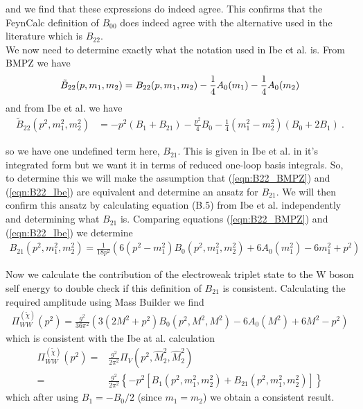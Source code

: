 \documentclass[11pt]{article}
\newcommand{\mb}{\textsf{Mass Builder} }
\newcommand{\feyncalc}{\textsf{FeynCalc} }
\begin{document}
and we find that these expressions do indeed agree.  This confirms that the \feyncalc definition of $B_{00}$ does indeed agree with the alternative used in the literature which is $B_{22}$.\\

We now need to determine exactly what the notation used in Ibe et al. is.  From BMPZ we have
\begin{align}
 \tilde
B_{22}(p,m_1,m_2)= B_{22}(p,m_1,m_2) - {1\over4}A_0(m_1) -
{1\over4}A_0(m_2) \label{eqn:B22_BMPZ}
\end{align}
and from Ibe et al. we have
\begin{align}
{\tilde B}_{22}(p^2, m_1^2, m_2^2) &=
- p^2 (B_1 + B_{21}) - \frac{p^2}{4} B_0 - \frac{1}{4}(m_1^2 - m_2^2) (B_0 + 2B_1)\ . \label{eqn:B22_Ibe}
\end{align}

so we have one undefined term here, $B_{21}$.  This is given in Ibe et al. in it's integrated form but we want it in terms of reduced one-loop basis integrals.  So, to determine this we will make the assumption that (\ref{eqn:B22_BMPZ}) and (\ref{eqn:B22_Ibe}) are equivalent and determine an ansatz for $B_{21}$.  We will then confirm this ansatz by calculating equation (B.5) from Ibe et al. independently and determining what $B_{21}$ is.  Comparing equations (\ref{eqn:B22_BMPZ}) and (\ref{eqn:B22_Ibe}) we determine
\begin{align}
B_{21}(p^2, m_1^2, m_2^2)  = \frac{1}{18 p^2} \left( 6 (p^2-m_1^2)B_0(p^2, m_1^2, m_2^2) +6A_0(m_1^2)-6m_1^2+p^2\right)
\end{align}

Now we calculate the contribution of the electroweak triplet state to the W boson self energy to double check if this definition of $B_{21}$ is consistent.  Calculating the required amplitude using \mb we find
\begin{align}
\Pi_{WW}^{(\tilde{\chi})}(p^2) =
\frac{g^2}{36\pi^2} \left( 3 (2M^2+p^2)B_0(p^2,M^2,M^2)-6A_0(M^2)+6M^2-p^2\right)
\end{align}
which is consistent with the Ibe at al. calculation
\begin{align}
\Pi_{WW}^{(\tilde{\chi})}(p^2) = &
\frac{g^2}{2\pi^2}
\Pi_V(p^2, \hat{M}_2^2, \hat{M}_2^2)\\
=& \frac{g^2}{2\pi^2} \left\{-p^2 \left[ B_1(p^2,m_1^2,m_2^2)+B_{21}(p^2,m_1^2,m_2^2)\right]\right\}
\end{align}
which after using $B_1 = -B_0/2$ (since $m_1=m_2$) we obtain a consistent result.
\end{document}
